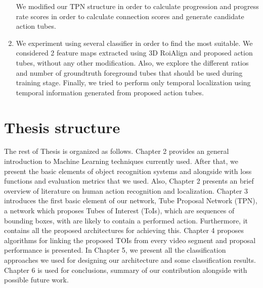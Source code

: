 \documentclass{report}
\begin{document}
\begin{enumerate}
  We modified our TPN structure in order to calculate progression and progress rate scores in order to calculate connection scores and generate candidate action tubes.
\item We experiment using several classifier in order to find the most suitable. We considered 2 feature maps extracted using 3D RoiAlign and proposed action tubes, without any other
  modification. Also, we explore the different ratios and number of groundtruth foreground tubes that should be used during training
  stage. Finally, we tried to perform only temporal localization using temporal information generated from proposed action tubes.
\end{enumerate}

\section{Thesis structure}
The rest of Thesis is organized as follows. Chapter 2 provides an general introduction to Machine Learning techniques currently used.
After that, we present the basic elements of object recognition systems and alongside with loss functions and evaluation metrics that
we used. Also, Chapter 2 presents an brief overview of literature on human action recognition and localization. Chapter 3 introduces the first basic element of our network, Tube Proposal Network (TPN), a network which proposes Tubes of Interest (ToIs), which are sequences of bounding boxes, with are likely to contain a performed action. Furthermore, it contains all the proposed architectures for achieving this.
Chapter 4 proposes algorithms for linking the proposed TOIs from every video segment and proposal performance is presented.
In Chapter 5, we present all the classification approaches we used for designing our architecture and some classification results.
Chapter 6 is used for conclusions, summary of our contribution alongside with possible future work.
\end{document}
